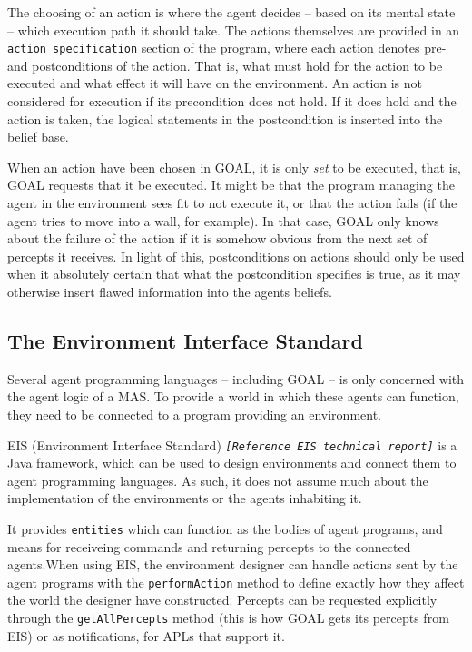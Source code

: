 The choosing of an action is where the agent decides -- based on its
mental state -- which execution path it should take. The actions themselves
are provided in an \texttt{action specification} section of the program,
where each action denotes pre- and postconditions of the action. That
is, what must hold for the action to be executed and what effect it
will have on the environment. An action is not considered for execution
if its precondition does not hold. If it does hold and the action
is taken, the logical statements in the postcondition is inserted
into the belief base. 

When an action have been chosen in GOAL, it is only \emph{set} to
be executed, that is, GOAL requests that it be executed. It might
be that the program managing the agent in the environment sees fit
to not execute it, or that the action fails (if the agent tries to
move into a wall, for example). In that case, GOAL only knows about
the failure of the action if it is somehow obvious from the next set
of percepts it receives. In light of this, postconditions on actions
should only be used when it absolutely certain that what the postcondition
specifies is true, as it may otherwise insert flawed information into
the agents beliefs.


\subsection{The Environment Interface Standard}

Several agent programming languages -- including GOAL -- is only concerned
with the agent logic of a MAS. To provide a world in which these agents
can function, they need to be connected to a program providing an
environment. 

EIS (Environment Interface Standard) \texttt{\emph{{[}Reference EIS
technical report{]}}} is a Java framework, which can be used to design
environments and connect them to agent programming languages. As such,
it does not assume much about the implementation of the environments
or the agents inhabiting it. 

It provides \texttt{entities} which can function as the bodies of
agent programs, and means for receiveing commands and returning percepts
to the connected agents.When using EIS, the environment designer can
handle actions sent by the agent programs with the \texttt{performAction}
method to define exactly how they affect the world the designer have
constructed. Percepts can be requested explicitly through the \texttt{getAllPercepts}
method (this is how GOAL gets its percepts from EIS) or as notifications,
for APLs that support it. 

